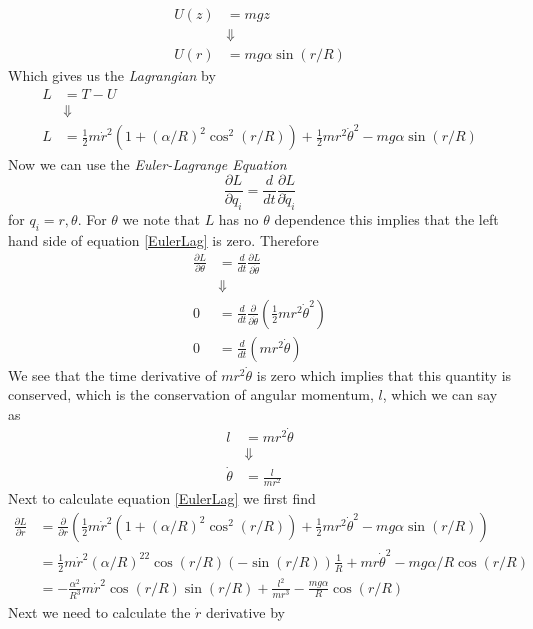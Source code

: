 \documentclass[11pt]{article}
\numberwithin{equation}{section}
\begin{document}
\begin{enumerate}[(a)]
\begin{align*}
U(z) &= mgz\\
&\Downarrow\\
U(r) &= mg\alpha\sin(r/R)
\end{align*}
Which gives us the \emph{Lagrangian} by
\begin{align*}
L &= T - U\\
&\Downarrow\\
L &= \frac{1}{2}m\dot{r}^2\left(1+\left(\alpha/R\right)^2\cos^2(r/R)\right)+ \frac{1}{2}mr^2\dot\theta^2 - mg\alpha\sin(r/R)
\end{align*}
Now we can use the \emph{Euler-Lagrange Equation} 
\begin{equation} 
\frac{\partial L}{\partial q_i} = \frac{d}{dt}\frac{\partial L}{\partial\dot{q}_i}
\label{EulerLag} 
\end{equation} 
for $q_i=r,\theta$. For $\theta$ we note that $L$ has no $\theta$ dependence this implies 
that the left hand side of equation \ref{EulerLag} is zero. Therefore
\begin{align*}
\frac{\partial L}{\partial\theta} &= \frac{d}{dt}\frac{\partial L}{\partial\dot{\theta}}\\
&\Downarrow\\
0 &= \frac{d}{dt}\frac{\partial}{\partial\dot{\theta}}\left(\frac{1}{2}mr^2\dot{\theta}^2\right)\\
0 &= \frac{d}{dt}\left(mr^2\dot{\theta}\right)
\end{align*}
We see that the time derivative of $mr^2\dot{\theta}$ is zero which implies that this 
quantity is conserved, which is the conservation of angular momentum, $l$,  which we can say
as
\begin{align*}
l &= mr^2\dot{\theta} \\
&\Downarrow\\
\dot{\theta} &= \frac{l}{mr^2}
\end{align*}
Next to calculate equation \ref{EulerLag} we first find
\begin{align*}
\frac{\partial L}{\partial r} &= \frac{\partial}{\partial r}\left(\frac{1}{2}m\dot{r}^2\left(1+\left(\alpha/R\right)^2\cos^2(r/R)\right)+ \frac{1}{2}mr^2\dot\theta^2 - mg\alpha\sin(r/R)\right)\\
&= \frac{1}{2}m\dot{r}^2\left(\alpha/R\right)^22\cos(r/R)(-\sin(r/R))\frac{1}{R} + mr\dot\theta^2 - mg\alpha/R\cos(r/R)\\
&= -\frac{\alpha^2}{R^3}m\dot{r}^2\cos(r/R)\sin(r/R) + \frac{l^2}{mr^3} - \frac{mg\alpha}{R}\cos(r/R)
\end{align*}
Next we need to calculate the $\dot{r}$ derivative by

\end{enumerate}
\end{document}
